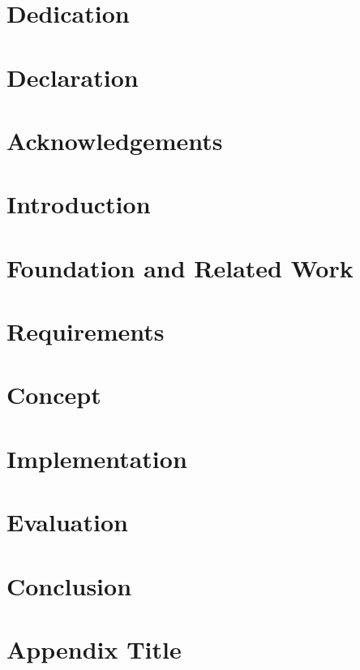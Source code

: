 \documentclass[a4paper,12pt]{report}
\begin{document}



\chapter*{Dedication}

\chapter*{Declaration}

\chapter*{Acknowledgements}


\tableofcontents
\listoffigures
\listoftables

\chapter{Introduction}

\chapter{Foundation and Related Work}

\chapter{Requirements}

\chapter{Concept}

\chapter{Implementation}

\chapter{Evaluation}

\chapter{Conclusion}


\appendix

\chapter{Appendix Title}


\printbibliography

\end{document}
